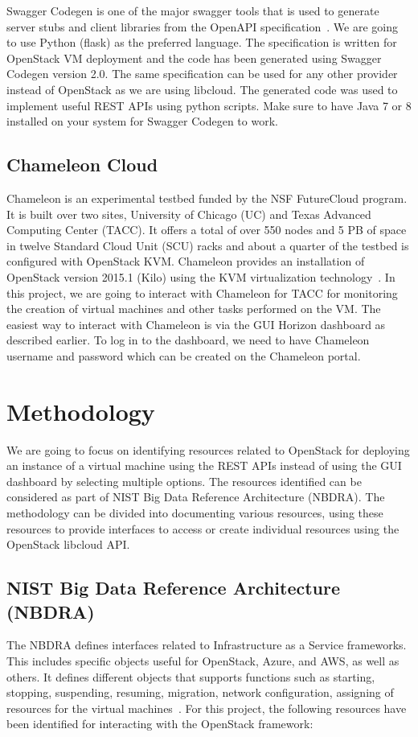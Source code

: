 Swagger Codegen is one of the major swagger tools that is used to generate
server stubs and client libraries from the OpenAPI
specification~\cite{hid-sp18-516-www-swagger}. We are going to use Python
(flask) as the preferred language. The specification is written for OpenStack 
VM deployment and the code has been generated using Swagger Codegen version 
2.0. The same specification can be used for any other provider instead of 
OpenStack as we are using libcloud. The generated code was used to implement 
useful REST APIs using python scripts. Make sure to have Java 7 or 8 installed 
on your system for Swagger Codegen to work. 

\subsection{Chameleon Cloud}
Chameleon is an experimental testbed funded by the NSF FutureCloud program. It
is built over two sites, University of Chicago (UC) and Texas Advanced
Computing Center (TACC). It offers a total of over 550 nodes and 5 PB of space
in twelve Standard Cloud Unit (SCU) racks and about a quarter of the testbed 
is configured with OpenStack KVM. Chameleon provides an installation of 
OpenStack version 2015.1 (Kilo) using the KVM virtualization
technology~\cite{hid-sp18-516-las-handbook}. In this project, we are going to
interact with Chameleon for TACC for monitoring the creation of virtual 
machines and other tasks performed on the VM. The easiest way to interact 
with Chameleon is via the GUI Horizon dashboard as described earlier. To log 
in to the dashboard, we need to have Chameleon username and password which can 
be created on the Chameleon portal. 

\section{Methodology}
We are going to focus on identifying resources related to OpenStack for
deploying an instance of a virtual machine using the REST APIs instead of
using the GUI dashboard by selecting multiple options. The resources 
identified can be considered as part of NIST Big Data Reference 
Architecture (NBDRA). The methodology can be divided into documenting various
resources, using these resources to provide interfaces to access or create
individual resources using the OpenStack libcloud API.

\subsection{NIST Big Data Reference Architecture (NBDRA)}
The NBDRA defines interfaces related to Infrastructure as a Service frameworks.
This includes specific objects useful for OpenStack, Azure, and AWS, as well as
others. It defines different objects that supports functions such as starting,
stopping, suspending, resuming, migration, network configuration, assigning of
resources for the virtual machines~\cite{hid-sp18-516-nist-vol8}. For this
project, the following resources have been identified for interacting with the
OpenStack framework:

